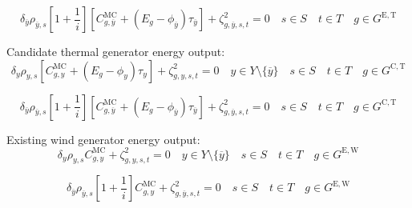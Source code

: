 \documentclass{article}
\newcommand{\sGeneratorsExistingThermal}{G^{\mathrm{E,T}}}
\newcommand{\sGeneratorsExistingWind}{G^{\mathrm{E,W}}}
\newcommand{\sGeneratorsCandidateThermal}{G^{\mathrm{C,T}}}
\newcommand{\sYears}{Y}
\newcommand{\sScenarios}{S}
\newcommand{\sIntervals}{T}
\newcommand{\iGenerator}{g}
\newcommand{\iYear}{y}
\newcommand{\iYearTerminal}{\overline{\iYear}}
\newcommand{\iScenario}{s}
\newcommand{\iInterval}{t}
\newcommand{\cScenarioDuration}[1][\iYear,\iScenario]{\rho_{#1}}
\newcommand{\cMarginalCost}[1][\iGenerator,\iYear]{C^{\mathrm{MC}}_{#1}}
\newcommand{\cEmissionsIntensity}[1][\iGenerator]{E_{#1}}
\newcommand{\cInterestRate}{i}
\newcommand{\cDiscountRate}[1][\iYear]{\delta_{#1}}
\newcommand{\vBaseline}[1][\iYear]{\phi_{#1}}
\newcommand{\vPermitPrice}[1][\iYear]{\tau_{#1}}
\newcommand{\dGeneratorEnergyOutput}[1][\iGenerator,\iYear,\iScenario,\iInterval]{\zeta_{#1}^{2}}
\begin{document}
\begin{equation}
\cDiscountRate[\iYearTerminal] \cScenarioDuration[\iYearTerminal,\iScenario] \left[1 + \frac{1}{\cInterestRate}\right] \left[\cMarginalCost[\iGenerator,\iYearTerminal] + \left(\cEmissionsIntensity - \vBaseline[\iYearTerminal]\right)\vPermitPrice[\iYearTerminal] \right]  + \dGeneratorEnergyOutput[\iGenerator,\iYearTerminal,\iScenario,\iInterval] = 0 \quad \iScenario \in \sScenarios \quad \iInterval \in \sIntervals \quad \iGenerator \in \sGeneratorsExistingThermal
\end{equation}

Candidate thermal generator energy output:
\begin{equation}
\cDiscountRate \cScenarioDuration \left[\cMarginalCost + \left(\cEmissionsIntensity - \vBaseline\right)\vPermitPrice \right]  + \dGeneratorEnergyOutput = 0 \quad \iYear \in \sYears \setminus \{\iYearTerminal\} \quad \iScenario \in \sScenarios \quad \iInterval \in \sIntervals \quad \iGenerator \in \sGeneratorsCandidateThermal
\end{equation}

\begin{equation}
\cDiscountRate[\iYearTerminal] \cScenarioDuration[\iYearTerminal,\iScenario] \left[1 + \frac{1}{\cInterestRate}\right] \left[\cMarginalCost[\iGenerator,\iYearTerminal] + \left(\cEmissionsIntensity - \vBaseline[\iYearTerminal]\right)\vPermitPrice[\iYearTerminal] \right]  + \dGeneratorEnergyOutput[\iGenerator,\iYearTerminal,\iScenario,\iInterval] = 0 \quad \iScenario \in \sScenarios \quad \iInterval \in \sIntervals \quad \iGenerator \in \sGeneratorsCandidateThermal
\end{equation}

Existing wind generator energy output:
\begin{equation}
\cDiscountRate\cScenarioDuration \cMarginalCost + \dGeneratorEnergyOutput = 0 \quad \iYear \in \sYears \setminus \{\iYearTerminal\} \quad \iScenario \in \sScenarios \quad \iInterval \in \sIntervals \quad \iGenerator \in \sGeneratorsExistingWind
\end{equation}

\begin{equation}
\cDiscountRate[\iYearTerminal] \cScenarioDuration[\iYearTerminal,\iScenario] \left[1 + \frac{1}{\cInterestRate}\right] \cMarginalCost + \dGeneratorEnergyOutput[\iGenerator,\iYearTerminal,\iScenario,\iInterval] = 0 \quad \iScenario \in \sScenarios \quad \iInterval \in \sIntervals \quad \iGenerator \in \sGeneratorsExistingWind
\end{equation}
\end{document}
